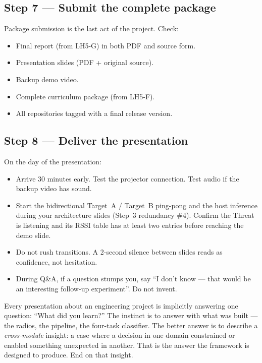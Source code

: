 \documentclass[11pt,letterpaper]{article}
\begin{document}
\subsection{Step 7 --- Submit the complete package}
Package submission is the last act of the project. Check:
\begin{itemize}[leftmargin=2em]
	\item Final report (from LH5-G) in both PDF and source form.
	\item Presentation slides (PDF + original source).
	\item Backup demo video.
	\item Complete curriculum package (from LH5-F).
	\item All repositories tagged with a final release version.
\end{itemize}

\subsection{Step 8 --- Deliver the presentation}
On the day of the presentation:
\begin{itemize}[leftmargin=2em]
	\item Arrive 30 minutes early. Test the projector connection. Test audio if the backup video has sound.
	\item Start the bidirectional Target~A / Target~B ping-pong and the host inference during your architecture slides (Step~3 redundancy \#4). Confirm the Threat is listening and its RSSI table has at least two entries before reaching the demo slide.
	\item Do not rush transitions. A 2-second silence between slides reads as confidence, not hesitation.
	\item During \mbox{Q\&A}, if a question stumps you, say ``I don't know --- that would be an interesting follow-up experiment''. Do not invent.
\end{itemize}

\begin{tcolorbox}[infobox={The Closing Message}]
	Every presentation about an engineering project is implicitly answering one question: ``What did you learn?'' The instinct is to answer with what was built --- the radios, the \FPGA{} pipeline, the four-task classifier. The better answer is to describe a \emph{cross-module} insight: a case where a decision in one domain constrained or enabled something unexpected in another. That is the answer the framework is designed to produce. End on that insight.
\end{tcolorbox}
\end{document}
